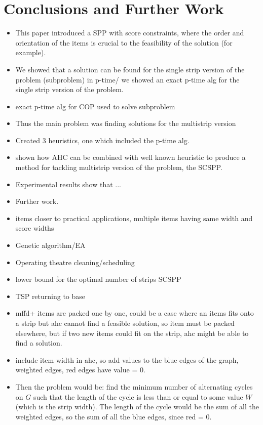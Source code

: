 \documentclass[oribibl]{llncs}
\begin{document}
\section{Conclusions and Further Work}
\begin{itemize}
	\item This paper introduced a SPP with score constraints, where the order and orientation of the items is crucial to the feasibility of the solution (for example).
	\item We showed that a solution can be found for the single strip version of the problem (subproblem) in p-time/ we showed an exact p-time alg for the single strip version of the problem. 
	\item exact p-time alg for COP used to solve subproblem
	\item Thus the main problem was finding solutions for the multistrip version
	\item Created 3 heuristics, one which included the p-time alg. 
	\item shown how AHC can be combined with well known heuristic to produce a method for tackling multistrip version of the problem, the SCSPP.
	\item Experimental results show that ...
	\item Further work.
	\item items closer to practical applications, multiple items having same width and score widths
	\item Genetic algorithm/EA
	\item Operating theatre cleaning/scheduling
	\item lower bound for the optimal number of strips SCSPP
	\item \cite{miller1960} TSP returning to base
	\item mffd+ items are packed one by one, could be a case where an items fits onto a strip but ahc cannot find a feasible solution, so item must be packed elsewhere, but if two new items could fit on the strip, ahc might be able to find a solution. 
	\item include item width in ahc, so add values to the blue edges of the graph, weighted edges, red edges have value = 0.
	\item Then the problem would be: find the minimum number of alternating cycles on $G$ such that the length of the cycle is less than or equal to some value $W$ (which is the strip width). The length of the cycle would be the sum of all the weighted edges, so the sum of all the blue edges, since red = 0. 

\end{itemize}
\end{document}
